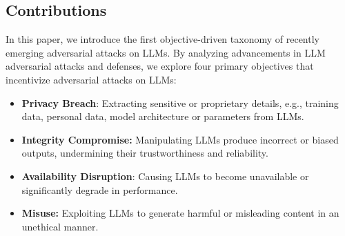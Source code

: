 \begin{table*}[h!]
    \centering
    \caption{The state-of-the-art taxonomies of adversarial attacks on LLMs.}
    \label{table:comparison}
\end{table*}

\subsection{Contributions}

In this paper, we introduce the first objective-driven taxonomy of recently emerging adversarial attacks on LLMs. By analyzing advancements in LLM adversarial attacks and defenses, we explore four primary objectives that incentivize adversarial attacks on LLMs:
\begin{itemize}
    \item{\bf Privacy Breach}: Extracting sensitive or proprietary details, e.g., training data, personal data, model architecture or parameters from LLMs. 

    \item{\bf Integrity Compromise:}  Manipulating LLMs produce incorrect or biased outputs, undermining their trustworthiness and reliability. 

    \item{\bf Availability Disruption}: Causing LLMs to become unavailable or significantly degrade in performance.

    \item{\bf Misuse:} Exploiting LLMs to generate harmful or misleading content in an unethical manner.
\end{itemize}

